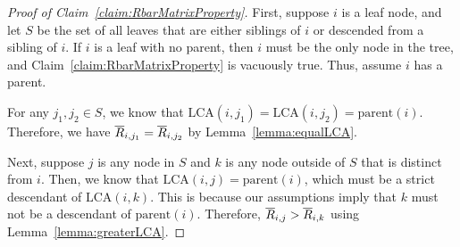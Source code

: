 \documentclass{article}
\theoremstyle{definition}
\begin{document}
\begin{proof}[Proof of Claim~\ref{claim:RbarMatrixProperty}]
First, suppose $i$ is a leaf node, and let $S$ be the set of all leaves that are either siblings of $i$ or descended from a sibling of $i$.
If $i$ is a leaf with no parent, then $i$ must be the only node in the tree, and Claim~\ref{claim:RbarMatrixProperty} is vacuously true.
Thus, assume $i$ has a parent.

For any $j_1, j_2 \in S$, we know that $\text{LCA}(i, j_1) = \text{LCA}(i, j_2) = \text{parent}(i)$.
Therefore, we have $\overline{R}_{i,j_1} = \overline{R}_{i,j_2}$ by Lemma~\ref{lemma:equalLCA}.

Next, suppose $j$ is any node in $S$ and $k$ is any node outside of $S$ that is distinct from $i$.
Then, we know that $\text{LCA}(i,j) = \text{parent}(i)$, which must be a strict descendant of $\text{LCA}(i,k)$.
This is because our assumptions imply that $k$ must not be a descendant of $\text{parent}(i)$.
Therefore, $\overline{R}_{i,j} > \overline{R}_{i,k}$ using Lemma~\ref{lemma:greaterLCA}.
\end{proof}
\end{document}
